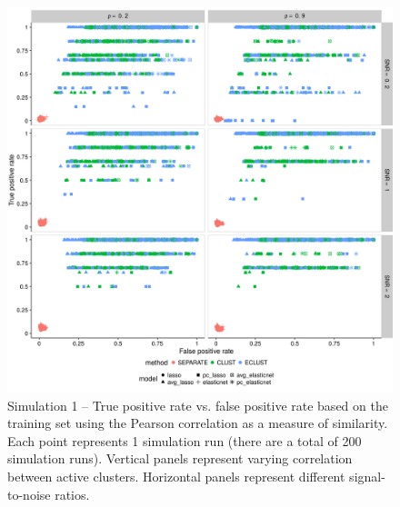 \begin{figure}
	\includegraphics[scale=0.6, keepaspectratio]{./figs/hydra/results/figures/sim1-sept10/tpr_fpr_Correlation_sim1.png}
	\caption{Simulation 1 -- True positive rate vs. false positive rate based on the training set using the Pearson correlation as a measure of similarity. Each point represents 1 simulation run (there are a total of 200 simulation runs). Vertical panels represent varying correlation between active clusters. Horizontal panels represent different signal-to-noise ratios.}
	\label{fig:tpr_fpr_Correlation_sim1}
\end{figure}



